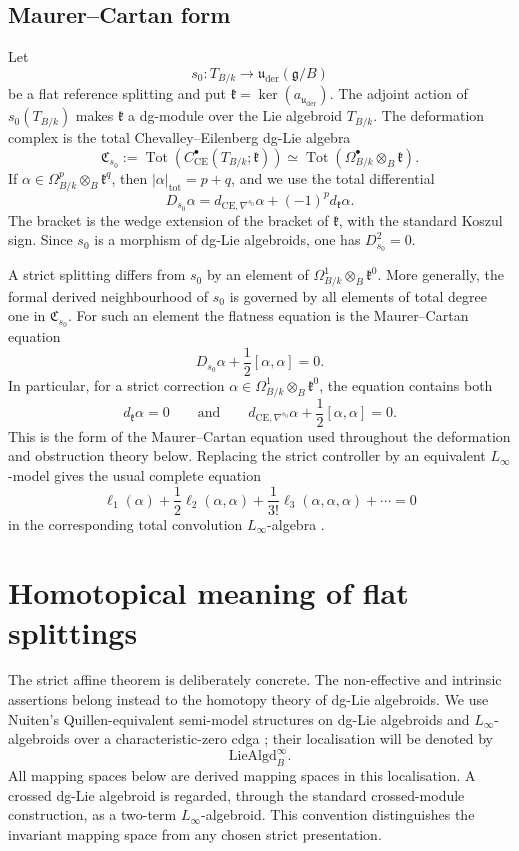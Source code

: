 \documentclass[11pt,reqno,a4paper,dvipsnames,x11names]{amsart}
\numberwithin{equation}{section}
\theoremstyle{plain}
\theoremstyle{definition}
\theoremstyle{remark}
\DeclareMathOperator{\Tot}{Tot}
\newcommand{\kk}{k}
\newcommand{\g}{\mathfrak g}
\newcommand{\kfr}{\mathfrak k}
\newcommand{\uuder}{\mathfrak u_{\mathrm{der}}}
\newcommand{\from}{\colon}
\begin{document}
\subsection{Maurer--Cartan form}

Let
\[
 s_0\from T_{B/\kk}\longrightarrow\uuder(\g/B)
\]
be a flat reference splitting and put \(\kfr=\ker(a_{\uuder})\). The adjoint action of
\(s_0(T_{B/\kk})\) makes \(\kfr\) a dg-module over the Lie algebroid
\(T_{B/\kk}\). The deformation complex is the total Chevalley--Eilenberg dg-Lie algebra
\[
 \mathfrak C_{s_0}
 :=\Tot\!\left(
 C^\bullet_{\mathrm{CE}}(T_{B/\kk};\kfr)
 \right)
 \simeq
 \Tot\!\left(
 \Omega^\bullet_{B/\kk}\otimes_B\kfr
 \right).
\]
If \(\alpha\in\Omega^p_{B/\kk}\otimes_B\kfr^q\), then
\(|\alpha|_{\mathrm{tot}}=p+q\), and we use the total differential
\[
 D_{s_0}\alpha
 =d_{\mathrm{CE},\nabla^{s_0}}\alpha
   +(-1)^p d_{\kfr}\alpha.
\]
The bracket is the wedge extension of the bracket of \(\kfr\), with the standard Koszul sign. Since \(s_0\) is a morphism of dg-Lie algebroids, one has
\(D_{s_0}^2=0\).

A strict splitting differs from \(s_0\) by an element of
\(\Omega^1_{B/\kk}\otimes_B\kfr^0\). More generally, the formal derived neighbourhood of
\(s_0\) is governed by all elements of total degree one in \(\mathfrak C_{s_0}\). For such an element the flatness equation is the Maurer--Cartan equation
\[
 D_{s_0}\alpha+\frac12[\alpha,\alpha]=0.
\]
In particular, for a strict correction
\(\alpha\in\Omega^1_{B/\kk}\otimes_B\kfr^0\), the equation contains both
\[
 d_{\kfr}\alpha=0
 \qquad\text{and}\qquad
 d_{\mathrm{CE},\nabla^{s_0}}\alpha
 +\frac12[\alpha,\alpha]=0.
\]
This is the form of the Maurer--Cartan equation used throughout the deformation and obstruction theory below. Replacing the strict controller by an equivalent
\(L_\infty\)-model gives the usual complete equation
\[
 \ell_1(\alpha)+\frac12\ell_2(\alpha,\alpha)
 +\frac1{3!}\ell_3(\alpha,\alpha,\alpha)+\cdots=0
\]
in the corresponding total convolution \(L_\infty\)-algebra \cite{Hinich01,Pridham10,Nuiten}.


\section{Homotopical meaning of flat splittings}\label{sec:homotopical-controllers}

The strict affine theorem is deliberately concrete. The non-effective and intrinsic assertions belong instead to the homotopy theory of dg-Lie algebroids. We use Nuiten's Quillen-equivalent semi-model structures on dg-Lie algebroids and \(L_\infty\)-algebroids over a characteristic-zero cdga \cite{Nuiten}; their localisation will be denoted by
\[
 \mathrm{LieAlgd}^{\infty}_{B}.
\]
All mapping spaces below are derived mapping spaces in this localisation. A crossed dg-Lie algebroid is regarded, through the standard crossed-module construction, as a two-term \(L_\infty\)-algebroid. This convention distinguishes the invariant mapping space from any chosen strict presentation.
\end{document}
